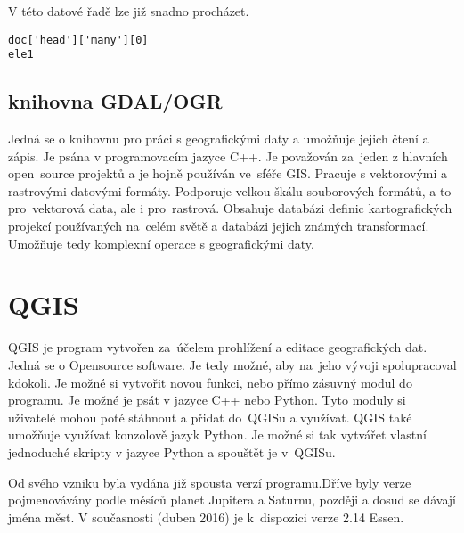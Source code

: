 V této datové řadě lze již snadno procházet. 

{\scriptsize
\lstset{language=Python}
\begin{lstlisting}
doc['head']['many'][0]
ele1
\end{lstlisting}
}

\subsection{knihovna GDAL/OGR}
\label{GDAL/OGR}
Jedná se o knihovnu pro práci s geografickými daty a umožňuje jejich
čtení a zápis. Je psána v programovacím jazyce C++. Je považován
za~jeden z hlavních open~source projektů a je hojně používán ve~sféře
GIS. Pracuje s vektorovými a rastrovými datovými formáty. Podporuje
velkou škálu souborových formátů, a to pro~vektorová data, ale i
pro~rastrová. Obsahuje databázi definic kartografických projekcí
používaných na~celém světě a databázi jejich známých transformací.
Umožňuje tedy komplexní operace s geografickými daty. \cite{GDAL}

\section{QGIS}
\label{QGIS}
QGIS je program vytvořen za~účelem prohlížení a editace geografických
dat. Jedná se o Opensource software. Je tedy možné, aby na~jeho vývoji
spolupracoval kdokoli. Je možné si vytvořit novou funkci, nebo přímo
zásuvný modul do programu. Je možné je psát v jazyce C++ nebo Python.
Tyto moduly si uživatelé mohou poté stáhnout a přidat do~QGISu a 
využívat. QGIS také umožňuje využívat konzolově jazyk Python. Je možné
si tak vytvářet vlastní jednoduché skripty v jazyce Python a spouštět
je v~QGISu.

Od svého vzniku byla vydána již spousta verzí programu.Dříve byly
verze pojmenovávány podle měsíců planet Jupitera a Saturnu, později
a dosud se dávají jména měst. V současnosti (duben 2016) je
k~dispozici verze 2.14 Essen.
